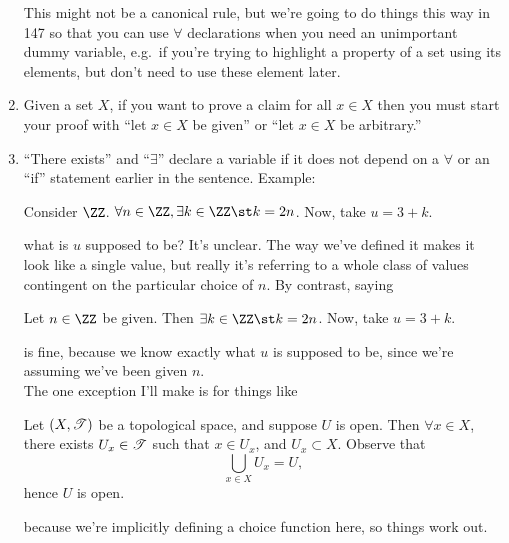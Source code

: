 \documentclass{fkpset}
\begin{document}
\begin{problem}[A2]
\begin{enumerate}[label=(\arabic*)]
      This might not be a canonical rule, but we're going to do things this way
      in 147 so that you can use $\forall$ declarations when you need an
      unimportant dummy variable, e.g.\ if you're trying to highlight a property
      of a set using its elements, but don't need to use these element
      later.\vspace{.5em}
    \item Given a set $X$, if you want to prove a claim for all $x \in X$ then
      you must start your proof with ``let $x \in X$ be given'' or ``let $x \in
      X$ be arbitrary.''\vspace{.5em}
    \item ``There exists'' and ``$\exists$'' declare a variable if it does not
      depend on a $\forall$ or an ``if'' statement earlier in the sentence.
      Example:
      \begin{leftbar}
        Consider $\ZZ$. $\forall n \in \ZZ, \exists k\in \ZZ \st k = 2n$. Now,
        take $u = 3+k$.
      \end{leftbar}
      what is $u$ supposed to be? It's unclear. The way we've defined it makes
      it look like a single value, but really it's referring to a whole class of
      values contingent on the particular choice of $n$. By contrast, saying
      \begin{leftbar}
        Let $n \in \ZZ$ be given. Then $\exists k \in \ZZ \st k = 2n$. Now, take
        $u = 3 +k$.
      \end{leftbar}
      is fine, because we know exactly what $u$ is supposed to be, since we're
      assuming we've been given $n$.\\

      The one exception I'll make is for things like
      \begin{leftbar}
        Let $(X,\mathscr{T})$ be a topological space, and suppose $U$ is open. Then
        $\forall x \in X$, there exists $U_x \in \mathscr{T}$ such that $x \in U_x$,
        and $U_x \subset X$. Observe that
        \[
          \bigcup_{x \in X} U_x = U,
        \]
        hence $U$ is open.
      \end{leftbar}
      because we're implicitly defining a choice function here, so things work
      out.
  \end{enumerate}
\end{problem}
\end{document}
